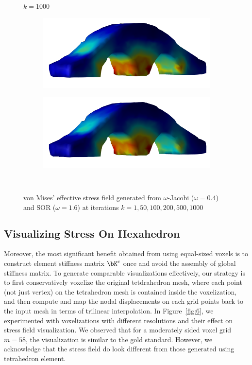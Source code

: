 \documentclass[11pt,titlepage]{article}
\begin{document}
\begin{figure}[!htbp]
\begin{center}
        $k=1000$
        \quad
        \begin{subfigure}[b]{0.4\textwidth}
            \centering
            \includegraphics[width=\textwidth]{jacopt_vm/resized/archbridge_tiny_1000}
        \end{subfigure}
        \begin{subfigure}[b]{0.4\textwidth}
            \centering
            \includegraphics[width=\textwidth]{soropt_vm/resized/archbridge_tiny_1000}
        \end{subfigure}\\ 
        \caption{\label{fig:5} von Mises' effective stress field generated from $\omega$-Jacobi ($\omega=0.4$) and SOR ($\omega=1.6$) at iterations $k=1,50,100,200,500,1000$}
    \end{center}
\end{figure}

\subsection{Visualizing Stress On Hexahedron}
Moreover, the most significant benefit obtained from using equal-sized voxels is to construct element stiffness matrix $\bK^e$ once and avoid the assembly of global stiffness matrix. To generate comparable visualizations effectively, our strategy is to first conservatively voxelize the original tetdrahedron mesh, where each point (not just vertex) on the tetrahedron mesh is contained inside the voxelization, and then compute and map the nodal displacements on each grid points back to the input mesh in terms of trilinear interpolation. In Figure~\ref{fig:6}, we experimented with voxelizations with different resolutions and their effect on stress field visualization. We observed that for a moderately sided voxel grid $m=58$, the visualization is similar to the gold standard. However, we acknowledge that the stress field do look different from those generated using tetrahedron element.
\end{document}
